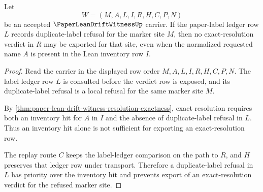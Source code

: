 \begin{theorem}
\label{thm:paper-lean-drift-witness-duplicate-label-priority}
Let
$$
W=(M,A,L,I,R,H,C,P,N)
$$
be an accepted $\PaperLeanDriftWitnessUp$ carrier. If the paper-label ledger row $L$ records duplicate-label refusal for the marker site $M$, then no exact-resolution verdict in $R$ may be exported for that site, even when the normalized requested name $A$ is present in the Lean inventory row $I$.
\end{theorem}
\begin{proof}
Read the carrier in the displayed row order $M,A,L,I,R,H,C,P,N$. The label ledger row $L$ is consulted before the verdict row is exposed, and its duplicate-label refusal is a local refusal for the same marker site $M$.

By \autoref{thm:paper-lean-drift-witness-resolution-exactness}, exact resolution requires both an inventory hit for $A$ in $I$ and the absence of duplicate-label refusal in $L$. Thus an inventory hit alone is not sufficient for exporting an exact-resolution row.

The replay route $C$ keeps the label-ledger comparison on the path to $R$, and $H$ preserves that ledger row under transport. Therefore a duplicate-label refusal in $L$ has priority over the inventory hit and prevents export of an exact-resolution verdict for the refused marker site.
\end{proof}

